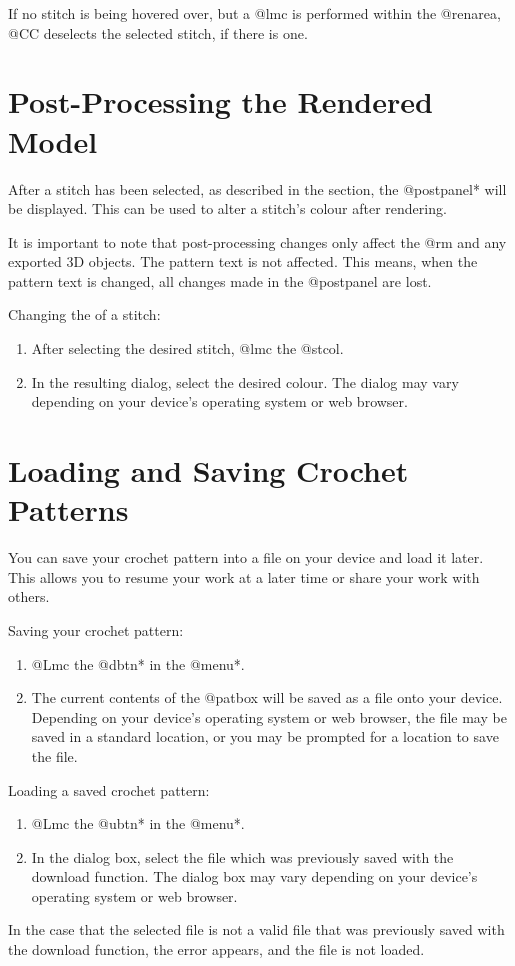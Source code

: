 \documentclass[main.tex]{subfiles}
\begin{document}
If no stitch is being hovered over, but a @lmc is performed within the @renarea, @CC deselects the selected stitch, if there is one.

\section{Post-Processing the Rendered Model}

After a stitch has been selected, as described in the  section, the @postpanel* will be displayed. This can be used to alter a stitch's colour after rendering.

It is important to note that post-processing changes only affect the @rm and any exported 3D objects. The pattern text is not affected. This means, when the pattern text is changed, all changes made in the @postpanel are lost.

Changing the  of a stitch:
\begin{enumerate}
\item After selecting the desired stitch, @lmc the @stcol.
\item In the resulting dialog, select the desired colour. The dialog may vary depending on your device's operating system or web browser.
\end{enumerate}

\section{Loading and Saving Crochet Patterns}

You can save your crochet pattern into a file on your device and load it later. This allows you to resume your work at a later time or share your work with others.

Saving your crochet pattern:
\begin{enumerate}
\item @Lmc the @dbtn* in the @menu*.
\item The current contents of the @patbox will be saved as a file onto your device. Depending on your device's operating system or web browser, the file may be saved in a standard location, or you may be prompted for a location to save the file.
\end{enumerate}

Loading a saved crochet pattern:
\begin{enumerate}
\item @Lmc the @ubtn* in the @menu*.
\item In the dialog box, select the file which was previously saved with the download function. The dialog box may vary depending on your device's operating system or web browser.
\end{enumerate}
In the case that the selected file is not a valid file that was previously saved with the download function, the error  appears, and the file is not loaded.
\end{document}
